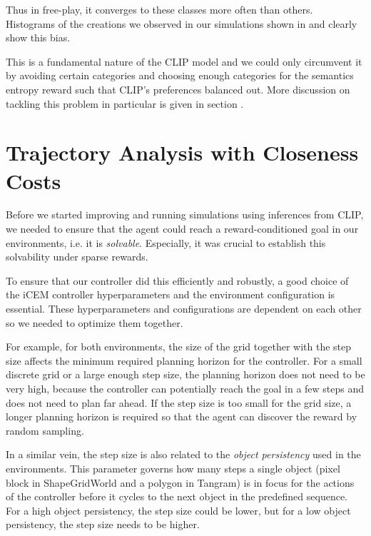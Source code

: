 Thus in free-play, it converges to these classes more often than others.
Histograms of the creations we observed in our simulations shown in  and  clearly show this bias.


This is a fundamental nature of the CLIP model and we could only circumvent it by avoiding certain categories and choosing enough categories for the semantics entropy reward such that CLIP's preferences balanced out.
More discussion on tackling this problem in particular is given in section .

\section{Trajectory Analysis with Closeness Costs}
\label{sec:closeness-rollouts}
Before we started improving and running simulations using inferences from CLIP, we needed to ensure that the agent could reach a reward-conditioned goal in our environments, i.e. it is \emph{solvable}.
Especially, it was crucial to establish this solvability under sparse rewards.

To ensure that our controller did this efficiently and robustly, a good choice of the iCEM controller hyperparameters and the environment configuration is essential.
These hyperparameters and configurations are dependent on each other so we needed to optimize them together.

For example, for both environments, the size of the grid together with the step size affects the minimum required planning horizon for the controller.
For a small discrete grid or a large enough step size, the planning horizon does not need to be very high, because the controller can potentially reach the goal in a few steps and does not need to plan far ahead.
If the step size is too small for the grid size, a longer planning horizon is required so that the agent can discover the reward by random sampling.

In a similar vein, the step size is also related to the \emph{object persistency} used in the environments.
This parameter governs how many steps a single object (pixel block in ShapeGridWorld and a polygon in Tangram) is in focus for the actions of the controller before it cycles to the next object in the predefined sequence.
For a high object persistency, the step size could be lower, but for a low object persistency, the step size needs to be higher.

